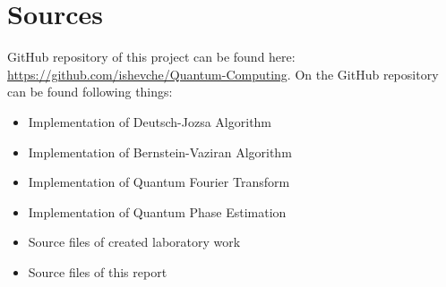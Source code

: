 \chapter{Sources} %

GitHub repository of this project can be found here: \url{https://github.com/ishevche/Quantum-Computing}.
On the GitHub repository can be found following things:
\begin{itemize}
    \item Implementation of Deutsch-Jozsa Algorithm
    \item Implementation of Bernstein-Vaziran Algorithm
    \item Implementation of Quantum Fourier Transform
    \item Implementation of Quantum Phase Estimation
    \item Source files of created laboratory work
    \item Source files of this report
\end{itemize}
